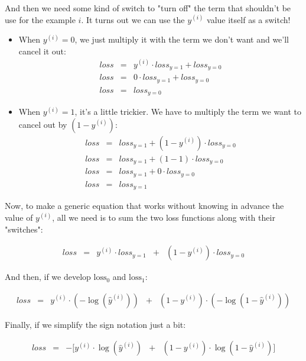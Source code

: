 And then we need some kind of switch to "turn off" the term that shouldn't be use for the example $i$.
It turns out we can use the $y^{(i)}$ value itself as a switch! 
\begin{itemize}
    \item When $y^{(i)} = 0$, we just multiply it with the term we don't want and we'll cancel it out:
          $$
          \begin{matrix}
          loss & = & y^{(i)} \cdot loss_{y=1} + loss_{y=0} \\
          loss & = & 0 \cdot loss_{y=1} + loss_{y=0} \\
          loss & = & loss_{y=0}
          \end{matrix}
          $$
    
    \item When $y^{(i)} = 1$, it's a little trickier. We have to multiply the term we want to cancel out by $(1 - y^{(i)})$:
          $$
          \begin{matrix}
          loss & = & loss_{y=1} + (1 - y^{(i)}) \cdot loss_{y=0} \\
          loss & = & loss_{y=1} + (1 - 1) \cdot loss_{y=0} \\
          loss & = & loss_{y=1} + 0 \cdot loss_{y=0}  \\
          loss & = & loss_{y=1}
          \end{matrix}
          $$
\end{itemize}

Now, to make a generic equation that works without knowing in advance the value of $y^{(i)}$, all we need is to sum the two loss functions along with their "switches":

$$
\begin{matrix}
loss & = & y^{(i)} \cdot loss_{y=1} & + & (1 - y^{(i)}) \cdot loss_{y=0}
\end{matrix}
$$

And then, if we develop $\text{loss}_0$ and $\text{loss}_1$:

$$
\begin{matrix}
loss & = & y^{(i)} \cdot (-\log(\hat{y}^{(i)})) & + & (1 - y^{(i)}) \cdot (-\log(1 - \hat{y}^{(i)}))
\end{matrix}
$$

Finally, if we simplify the sign notation just a bit:

$$
\begin{matrix}
loss & = & -[y^{(i)}\cdot\log(\hat{y}^{(i)}) & + & (1 - y^{(i)})\cdot\log(1 - \hat{y}^{(i)})]
\end{matrix}
$$

